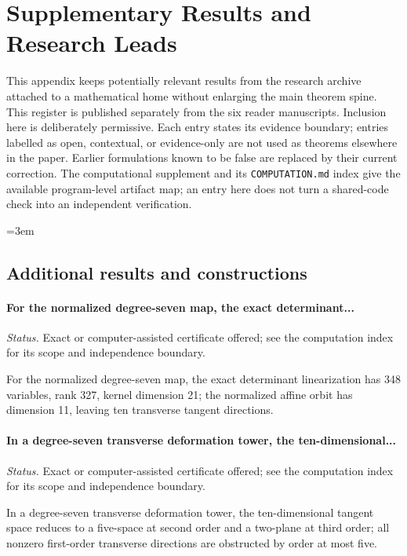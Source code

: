 \section{Supplementary Results and Research Leads}
\label{app:supplementary-register-03}

This appendix keeps potentially relevant results from the research
archive attached to a mathematical home without enlarging the main
theorem spine.  This register is published separately from the six reader manuscripts.  Inclusion here is deliberately permissive.  Each entry
states its evidence boundary; entries labelled as open, contextual, or
evidence-only are not used as theorems elsewhere in the paper.  Earlier
formulations known to be false are replaced by their current correction.
The computational supplement and its \texttt{COMPUTATION.md} index give
the available program-level artifact map; an entry here does not turn a
shared-code check into an independent verification.
\begingroup\raggedright\emergencystretch=3em

\subsection{Additional results and constructions}

\label{supp-note-03-001}
\paragraph{For the normalized degree-seven map, the exact determinant...}
\emph{Status.} Exact or computer-assisted certificate offered; see the computation index for its scope and independence boundary.

For the normalized degree-seven map, the exact determinant linearization has 348 variables, rank 327, kernel dimension 21; the normalized affine orbit has dimension 11, leaving ten transverse tangent directions.

\label{supp-note-03-002}
\paragraph{In a degree-seven transverse deformation tower, the ten-dimensional...}
\emph{Status.} Exact or computer-assisted certificate offered; see the computation index for its scope and independence boundary.

In a degree-seven transverse deformation tower, the ten-dimensional tangent space reduces to a five-space at second order and a two-plane at third order; all nonzero first-order transverse directions are obstructed by order at most five.

